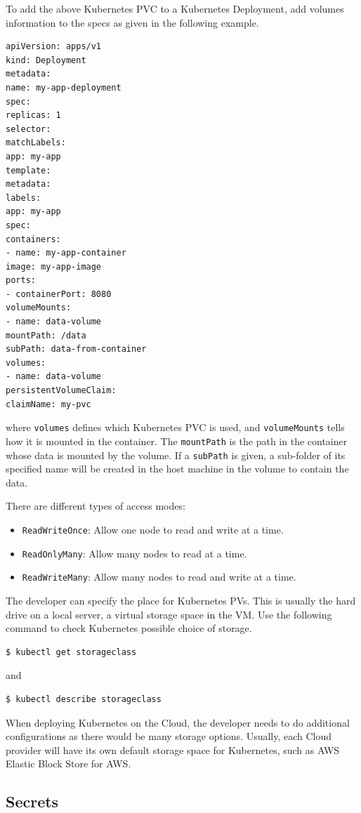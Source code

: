 To add the above Kubernetes PVC to a Kubernetes Deployment, add volumes information to the specs as given in the following example.
\begin{lstlisting}
apiVersion: apps/v1
kind: Deployment
metadata:
name: my-app-deployment
spec:
replicas: 1
selector:
matchLabels:
app: my-app
template:
metadata:
labels:
app: my-app
spec:
containers:
- name: my-app-container
image: my-app-image
ports:
- containerPort: 8080
volumeMounts:
- name: data-volume
mountPath: /data
subPath: data-from-container
volumes:
- name: data-volume
persistentVolumeClaim:
claimName: my-pvc
\end{lstlisting}
where \verb|volumes| defines which Kubernetes PVC is used, and \verb|volumeMounts| tells how it is mounted in the container. The \verb|mountPath| is the path in the container whose data is mounted by the volume. If a \verb|subPath| is given, a sub-folder of its specified name will be created in the host machine in the volume to contain the data.

There are different types of access modes:
\begin{itemize}
	\item \verb|ReadWriteOnce|: Allow one node to read and write at a time.
	\item \verb|ReadOnlyMany|: Allow many nodes to read at a time.
	\item \verb|ReadWriteMany|: Allow many nodes to read and write at a time.
\end{itemize}

The developer can specify the place for Kubernetes PVs. This is usually the hard drive on a local server, a virtual storage space in the VM. Use the following command to check Kubernetes possible choice of storage.
\begin{lstlisting}
$ kubectl get storageclass
\end{lstlisting}
and
\begin{lstlisting}
$ kubectl describe storageclass
\end{lstlisting}
When deploying Kubernetes on the Cloud, the developer needs to do additional configurations as there would be many storage options. Usually, each Cloud provider will have its own default storage space for Kubernetes, such as AWS Elastic Block Store for AWS.

\subsection{Secrets} \label{ch:vac:subsec:k8ssecrets}

